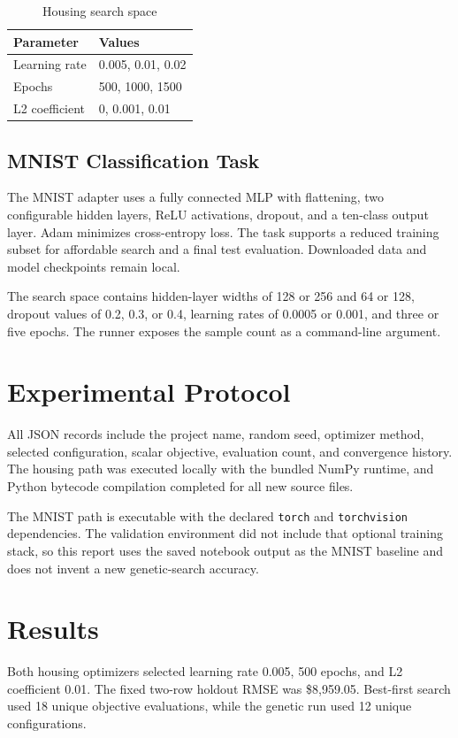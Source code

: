 \documentclass[conference]{IEEEtran}
\begin{document}
\begin{table}[t]
\caption{Housing search space}
\centering
\begin{tabular}{@{}ll@{}}
\toprule
Parameter & Values \\
\midrule
Learning rate & 0.005, 0.01, 0.02 \\
Epochs & 500, 1000, 1500 \\
L2 coefficient & 0, 0.001, 0.01 \\
\bottomrule
\end{tabular}
\label{tab:housing-space}
\end{table}

\subsection{MNIST Classification Task}
The MNIST adapter uses a fully connected MLP with flattening, two configurable hidden layers, ReLU activations, dropout, and a ten-class output layer. Adam minimizes cross-entropy loss. The task supports a reduced training subset for affordable search and a final test evaluation. Downloaded data and model checkpoints remain local.

The search space contains hidden-layer widths of 128 or 256 and 64 or 128, dropout values of 0.2, 0.3, or 0.4, learning rates of 0.0005 or 0.001, and three or five epochs. The runner exposes the sample count as a command-line argument.

\section{Experimental Protocol}
All JSON records include the project name, random seed, optimizer method, selected configuration, scalar objective, evaluation count, and convergence history. The housing path was executed locally with the bundled NumPy runtime, and Python bytecode compilation completed for all new source files.

The MNIST path is executable with the declared \texttt{torch} and \texttt{torchvision} dependencies. The validation environment did not include that optional training stack, so this report uses the saved notebook output as the MNIST baseline and does not invent a new genetic-search accuracy.

\section{Results}
Both housing optimizers selected learning rate 0.005, 500 epochs, and L2 coefficient 0.01. The fixed two-row holdout RMSE was \$8,959.05. Best-first search used 18 unique objective evaluations, while the genetic run used 12 unique configurations.
\end{document}

